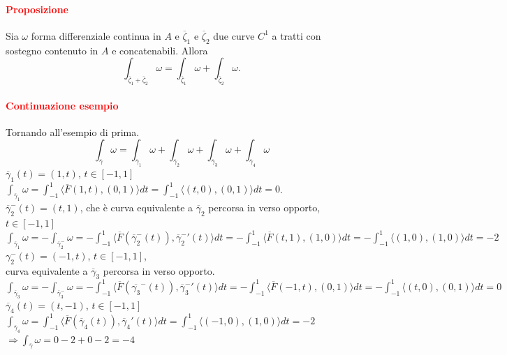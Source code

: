 \documentclass{article}
\begin{document}
\paragraph{\textcolor{red}{Proposizione}} Sia $\omega$ forma differenziale continua in $A$ e $\overline{\zeta}_1$ e $\overline{\zeta}_2$ due curve $C^1$ a tratti con sostegno contenuto in $A$ e concatenabili. Allora
\begin{equation*}
    \int_{\overline{\zeta}_1+\overline{\zeta}_2}\omega= \int_{\overline{\zeta}_1}\omega + \int_{\overline{\zeta}_2}\omega.
\end{equation*}

\paragraph{\textcolor{red}{Continuazione esempio}}
Tornando all'esempio di prima.
\begin{equation*}
    \int_{\overline{\gamma}}\omega=\int_{\overline{\gamma}_1}\omega+\int_{\overline{\gamma}_2}\omega + \int_{\overline{\gamma}_3}\omega + \int_{\overline{\gamma}_4} \omega
\end{equation*}
$\overline{\gamma}_1(t)=(1,t)$, $t \in [-1,1]$\\
$\int_{\overline{\gamma}_1}\omega =\int_{-1}^1 \langle \overline{F}(1,t), (0,1)\rangle dt = \int_{-1}^1 \langle (t,0), (0,1)\rangle dt=0$.\\
$\overline{\gamma}_2^-(t)=(t,1)$, che è curva equivalente a $\overline{\gamma}_2$ percorsa in verso opporto, $t\in[-1,1]$\\
$\int_{\overline{\gamma}_1}\omega= -\int_{\overline{\gamma}_2^-}\omega =-\int_{-1}^1 \langle 
\overline{F}(\overline{\gamma}_2^- (t)),\overline{\gamma}_2^-'(t)\rangle dt=-\int_{-1}^1 \langle 
\overline{F} (t,1),(1,0)\rangle dt = -\int_{-1}^1 \langle (1,0),(1,0) \rangle dt=-2$\\
$\gamma_2^-(t)=(-1,t)$, $t \in [-1,1]$,\\
curva equivalente a $\overline{\gamma}_3$ percorsa in verso opporto.\\
$\int_{\overline{\gamma}_3}\omega= -\int_{\overline{\gamma}_3^-}\omega =-\int_{-1}^1 \langle \overline{F}(\overline{\gamma_3}^-(t)), \overline{\gamma}_3^- ' (t) \rangle dt = -\int_{-1}^1 \langle \overline{F}(-1,t),(0,1) \rangle dt=-\int_{-1}^1 \langle (t,0),(0,1) \rangle dt =0$\\
$\overline{\gamma}_4(t)=(t,-1)$, $ t \in [-1,1]$\\
$\int_{\overline{\gamma}_4}\omega = \int_{-1}^1 \langle \overline{F}(\overline{\gamma}_4(t)),\overline{\gamma}_4'(t) \rangle dt= \int_{-1}^1 \langle (-1,0),(1,0) \rangle dt=-2$\\
$\Rightarrow \int_{\overline{\gamma}}\omega =0-2+0-2=-4$
\end{document}
